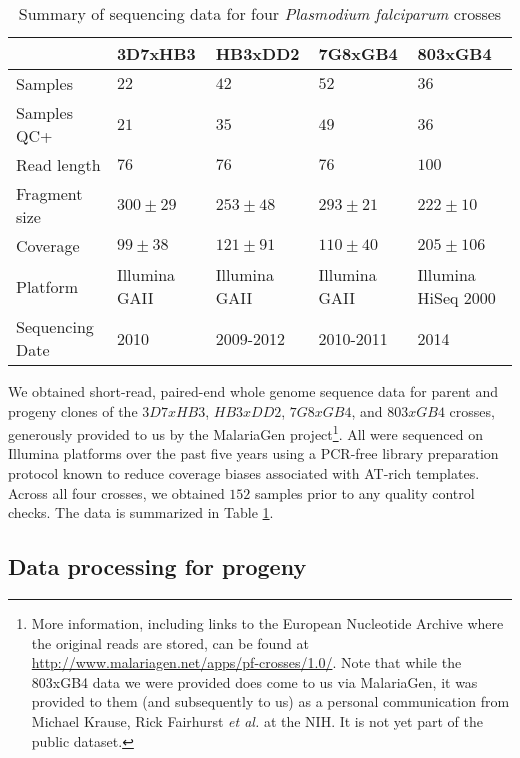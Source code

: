 \begin{table}[]
\centering
\caption{Summary of sequencing data for four \textit{Plasmodium falciparum} crosses}
\label{tbl:crosssummary}
\begin{tabular}{@{}lllll@{}}
\toprule
                & 3D7xHB3       & HB3xDD2       & 7G8xGB4       & 803xGB4             \\ \midrule
Samples         & $22$          & $42$          & $52$          & $36$                \\
Samples QC+     & $21$          & $35$          & $49$          & $36$                \\
Read length     & $76$          & $76$          & $76$          & $100$               \\
Fragment size   & $300 \pm 29$  & $253 \pm 48$  & $293 \pm 21$  & $222 \pm 10$        \\
Coverage        & $99  \pm 38$  & $121 \pm 91$  & $110 \pm 40$  & $205 \pm 106$       \\
Platform        & Illumina GAII & Illumina GAII & Illumina GAII & Illumina HiSeq 2000 \\
Sequencing Date & 2010          & 2009-2012     & 2010-2011     & 2014                \\ \bottomrule
\end{tabular}
\end{table}

We obtained short-read, paired-end whole genome sequence data for parent and progeny clones of the $3D7xHB3$\cite{Walliker:1987cv}, $HB3xDD2$\cite{Wellems:1990eg}, $7G8xGB4$\cite{Hayton:2008hn}, and $803xGB4$ crosses, generously provided to us by the MalariaGen project\footnote{More information, including links to the European Nucleotide Archive where the original reads are stored, can be found at \url{http://www.malariagen.net/apps/pf-crosses/1.0/}.  Note that while the 803xGB4 data we were provided does come to us via MalariaGen, it was provided to them (and subsequently to us) as a personal communication from Michael Krause, Rick Fairhurst \textit{et al.} at the NIH.  It is not yet part of the public dataset.}.  All were sequenced on Illumina platforms over the past five years using a PCR-free library preparation protocol known to reduce coverage biases associated with AT-rich templates.  Across all four crosses, we obtained $152$ samples prior to any quality control checks.  The data is summarized in Table \ref{tbl:crosssummary}.

\subsection{Data processing for progeny}

